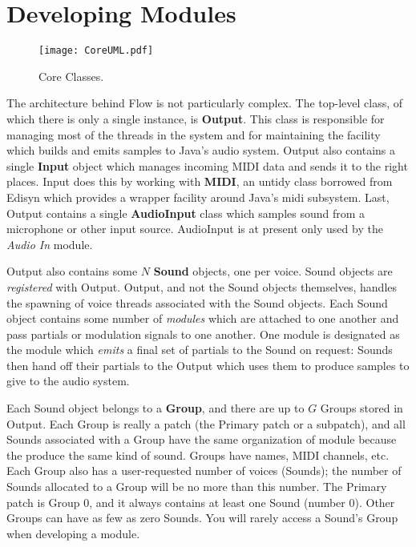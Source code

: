 \documentclass{article}
\newcommand\bump{\vspace{20in}}
\newcommand\name{Flow}
\begin{document}
\bump
\section{Developing Modules}

\begin{wrapfigure}{r}{3.5in}
\vspace{-1em}\texttt{[image: CoreUML.pdf]}
\vspace{-1em}
\caption{Core Classes.}
\vspace{-1em}
\end{wrapfigure}

The architecture behind {\name} is not particularly complex.  The top-level class, of which there is only a single instance, is {\bf Output}. This class is responsible for managing most of the threads in the system and for maintaining the facility which builds and emits samples to Java's audio system.  Output also contains a single {\bf Input} object which manages incoming MIDI data and sends it to the right places.  Input does this by working with {\bf MIDI}, an untidy class borrowed from Edisyn which provides a wrapper facility around Java's midi subsystem.  Last, Output contains a single {\bf AudioInput} class which samples sound from a microphone or other input source.  AudioInput is at present only used by the {\it Audio In} module.

Output also contains some \(N\) {\bf Sound} objects, one per voice.  Sound objects are {\it registered} with Output.  Output, and not the Sound objects themselves, handles the spawning of voice threads associated with the Sound objects.  Each Sound object contains some number of {\it modules} which are attached to one another and pass partials or modulation signals to one another.  One module is designated as the module which {\it emits} a final set of partials to the Sound on request: Sounds then hand off their partials to the Output which uses them to produce samples to give to the audio system. 

Each Sound object belongs to a {\bf Group}, and there are up to \(G\) Groups stored in Output.   Each Group is really a patch (the Primary patch or a subpatch), and all Sounds associated with a Group have the same organization of module because the produce the same kind of sound.  Groups have names, MIDI channels, etc.  Each Group also has a user-requested number of voices (Sounds); the number of Sounds allocated to a Group will be no more than this number.  The Primary patch is Group 0, and it always contains at least one Sound (number 0).  Other Groups can have as few as zero Sounds.  You will rarely access a Sound's Group when developing a module.
\end{document}

